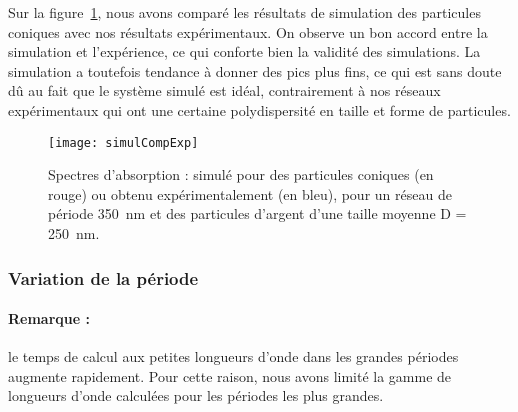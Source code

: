 Sur la figure~\ref{simulCompExp}, nous avons comparé les résultats de simulation des particules coniques avec nos résultats expérimentaux. On observe un bon accord entre la simulation et l'expérience, ce qui conforte bien la validité des simulations. La simulation a toutefois tendance à donner des pics plus fins, ce qui est sans doute dû au fait que le système simulé est idéal, contrairement à nos réseaux expérimentaux qui ont une certaine polydispersité en taille et forme de particules.\par 
\begin{figure}[!htb]
\centering
\texttt{[image: simulCompExp]}
\caption{Spectres d'absorption : simulé pour des particules coniques (en rouge) ou obtenu expérimentalement (en bleu), pour un réseau de période 350~nm et des particules d'argent d'une taille moyenne D = 250~nm.}
\label{simulCompExp}
\end{figure}
	\subsubsection{Variation de la période}
\paragraph*{Remarque :} le temps de calcul aux petites longueurs d'onde dans les grandes périodes augmente rapidement. Pour cette raison, nous avons limité la gamme de longueurs d'onde calculées pour les périodes les plus grandes.\par \vspace{12pt}

